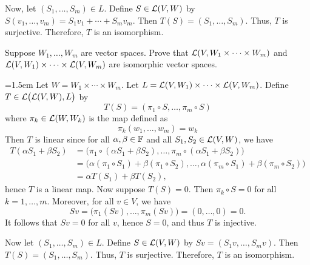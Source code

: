\begin{exc}
\begin{solution}
Now, let $(S_1,\dots,S_m)\in L$. Define $S\in\mathcal{L}(V,W)$ by
$S(v_1,\dots,v_m)=S_1v_1+\cdots+S_mv_m$. Then $T(S)=(S_1,\dots,S_m)$. Thus, $T$
is surjective. Therefore, $T$ is an isomorphism.
\end{solution}

\begin{exercise}
Suppose $W_1,\dots,W_m$ are vector spaces. Prove that
$\mathcal{L}(V,W_1\times\cdots\times W_m)$ and
$\mathcal{L}(V,W_1)\times\cdots\times\mathcal{L}(V,W_m)$ are isomorphic vector spaces.
\end{exercise}
\begin{solution}\emergencystretch=1.5em
Let $W=W_1\times\cdots\times W_m$. Let
$L=\mathcal{L}(V,W_1)\times\cdots\times\mathcal{L}(V,W_m)$. Define
$T\in\mathcal{L}\bigl(\mathcal{L}(V,W),L\bigr)$ by
\[ T(S) = (\pi_1\circ S,\dots,\pi_m\circ S) \]
where $\pi_k\in\mathcal{L}(W,W_k)$ is the map defined as
\[ \pi_k(w_1,\dots,w_m) = w_k \]
Then $T$ is linear since for all $\alpha,\beta\in\mathbb{F}$ and all
$S_1,S_2\in\mathcal{L}(V,W)$, we have
\begin{align*}
T(\alpha S_1+\beta S_2)
  &= \bigl(\pi_1\circ(\alpha S_1+\beta S_2),\dots,
     \pi_m\circ(\alpha S_1+\beta S_2)\bigr)\\
  &= \bigl(\alpha(\pi_1\circ S_1)+\beta(\pi_1\circ S_2),\dots,
     \alpha(\pi_m\circ S_1)+\beta(\pi_m\circ S_2)\bigr)\\
  &= \alpha T(S_1)+\beta T(S_2),
\end{align*}
hence $T$ is a linear map. Now suppose $T(S)=0$. Then $\pi_k\circ S=0$ for all
$k=1,\dots,m$. Moreover, for all $v\in V$, we have
\[ Sv = \bigl(\pi_1(Sv),\dots,\pi_m(Sv)\bigr) = (0,\dots,0) = 0. \]
It follows that $Sv=0$ for all $v$, hence $S=0$, and thus $T$ is injective.

Now let $(S_1,\dots,S_m)\in L$. Define $S\in\mathcal{L}(V,W)$ by
$Sv=(S_1v,\dots,S_mv)$. Then $T(S)=(S_1,\dots,S_m)$. Thus, $T$ is surjective.
Therefore, $T$ is an isomorphism.
\end{solution}


\end{exc}
